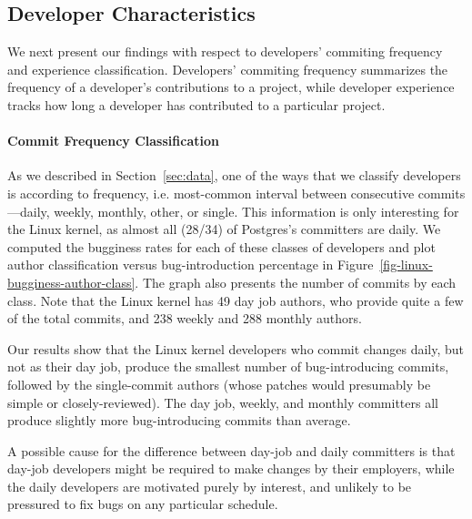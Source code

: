 
\subsection{Developer Characteristics}
\label{sec-dev-char}
We next present our findings with respect to developers' commiting 
frequency and experience classification. Developers'
commiting frequency summarizes the frequency of
a developer's contributions to a project, while developer experience
tracks how long a developer has contributed to a particular project.

\paragraph{Commit Frequency Classification} 
As we described in Section~\ref{sec:data}, one of the ways that we
classify developers is according to frequency, i.e. most-common
interval between consecutive commits---daily, weekly, monthly, other,
or single.  This information is only interesting for the Linux kernel,
as almost all (28/34) of Postgres's committers are daily. We computed
the bugginess rates for each of these classes of developers and plot
author classification versus bug-introduction percentage in
Figure~\ref{fig-linux-bugginess-author-class}. The graph also presents
the number of commits by each class. Note that the Linux kernel has 49
day job authors, who provide quite a few of the total commits, and 238
weekly and 288 monthly authors.

Our results show that the Linux kernel developers who commit changes daily, but
not as their day job, produce the smallest number of bug-introducing
commits, followed by the single-commit authors (whose patches would
presumably be simple or closely-reviewed). The day job, weekly, and
monthly committers all produce slightly more bug-introducing commits
than average.

A possible cause for the difference between day-job and daily
committers is that day-job developers might be required to make
changes by their employers, while the daily developers are motivated
purely by interest, and unlikely to be pressured to fix bugs on any
particular schedule.

